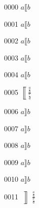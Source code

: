 \documentclass{article}
\begin{document}
0000 $a\llbracket b$\par
0001 $a\big\llbracket b$\par
0002 $a\Big\llbracket b$\par
0003 $a\bigg\llbracket b$\par
0004 $a\Bigg\llbracket b$\par
0005 $\left\llbracket \frac{\frac{a}{b}}{\frac{c}{d}}\right.$\par
0006 $a\rrbracket b$\par
0007 $a\big\rrbracket b$\par
0008 $a\Big\rrbracket b$\par
0009 $a\bigg\rrbracket b$\par
0010 $a\Bigg\rrbracket b$\par
0011 $\left\rrbracket \frac{\frac{a}{b}}{\frac{c}{d}}\right.$\par
\end{document}
